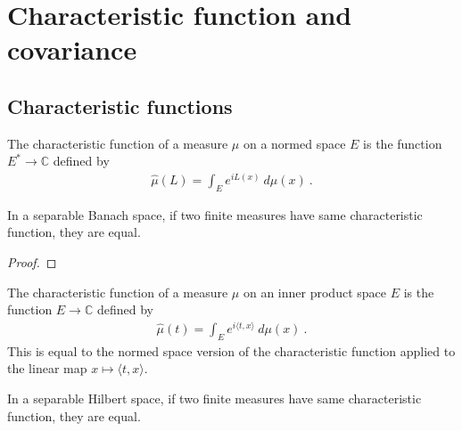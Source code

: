 \chapter{Characteristic function and covariance}

\section{Characteristic functions}
\label{sec:characteristic_function}


\begin{definition}\label{def:charFunDual}
  \mathlibok
The characteristic function of a measure $\mu$ on a normed space $E$ is the function $E^* \to \mathbb{C}$ defined by
\begin{align*}
  \hat{\mu}(L) = \int_E e^{i L(x)} \: d\mu(x) \: .
\end{align*}
\end{definition}


\begin{theorem}\label{thm:ext_of_charFunDual}
  \mathlibok
In a separable Banach space, if two finite measures have same characteristic function, they are equal.
\end{theorem}

\begin{proof}\leanok

\end{proof}


\begin{definition}\label{def:charFun}
  \mathlibok
The characteristic function of a measure $\mu$ on an inner product space $E$ is the function $E \to \mathbb{C}$ defined by
\begin{align*}
  \hat{\mu}(t) = \int_E e^{i \langle t, x \rangle} \: d\mu(x) \: .
\end{align*}
This is equal to the normed space version of the characteristic function applied to the linear map $x \mapsto \langle t, x \rangle$.
\end{definition}


\begin{theorem}\label{thm:ext_of_charFun}
  \mathlibok
In a separable Hilbert space, if two finite measures have same characteristic function, they are equal.
\end{theorem}


